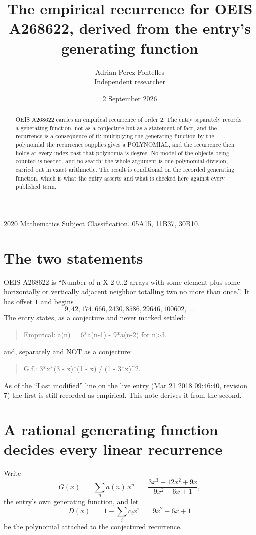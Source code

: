 \documentclass[11pt,a4paper]{article}
\title{The empirical recurrence for OEIS A268622, derived from the entry's generating function}
\author{Adrian Perez Fontelles\\ \small Independent researcher}
\date{2 September 2026}
\theoremstyle{plain}
\theoremstyle{definition}
\begin{document}
\maketitle

\begin{abstract}
OEIS A268622 carries an empirical recurrence of order $2$. The entry separately records a
generating function, not as a conjecture but as a statement of fact, and the recurrence is a
consequence of it: multiplying the generating function by the polynomial the recurrence
supplies gives a POLYNOMIAL, and the recurrence then holds at every index past that
polynomial's degree. No model of the objects being counted is needed, and no search: the
whole argument is one polynomial division, carried out in exact arithmetic. The result is
conditional on the recorded generating function, which is what the entry asserts and what is
checked here against every published term.
\end{abstract}

\noindent\small 2020 Mathematics Subject Classification. 05A15, 11B37, 30B10.\normalsize

\section{The two statements}

OEIS A268622 is ``Number of n X 2 0..2 arrays with some element plus some horizontally or vertically adjacent neighbor totalling two no more than once.''. It has offset $1$ and begins
\[
9, 42, 174, 666, 2430, 8586, 29646, 100602,\ \dots
\]
The entry states, as a conjecture and never marked settled:
\begin{quote}
Empirical: a(n) = 6*a(n-1) - 9*a(n-2) for n>3.
\end{quote}
and, separately and NOT as a conjecture:
\begin{quote}
G.f.: 3*x*(3 - x)*(1 - x) / (1 - 3*x)\^{}2.
\end{quote}
As of the ``Last modified'' line on the live entry (Mar 21 2018 09:46:40, revision 7) the first is still
recorded as empirical. This note derives it from the second.

\section{A rational generating function decides every linear recurrence}

Write
\[
G(x)\;=\;\sum_{n}a(n)\,x^{n}\;=\;\frac{3 x^{3} - 12 x^{2} + 9 x}{9 x^{2} - 6 x + 1},
\]
the entry's own generating function, and let
\[
D(x)\;=\;1-\sum_i c_i x^{i}\;=\;9 x^{2} - 6 x + 1
\]
be the polynomial attached to the conjectured recurrence.
\end{document}
